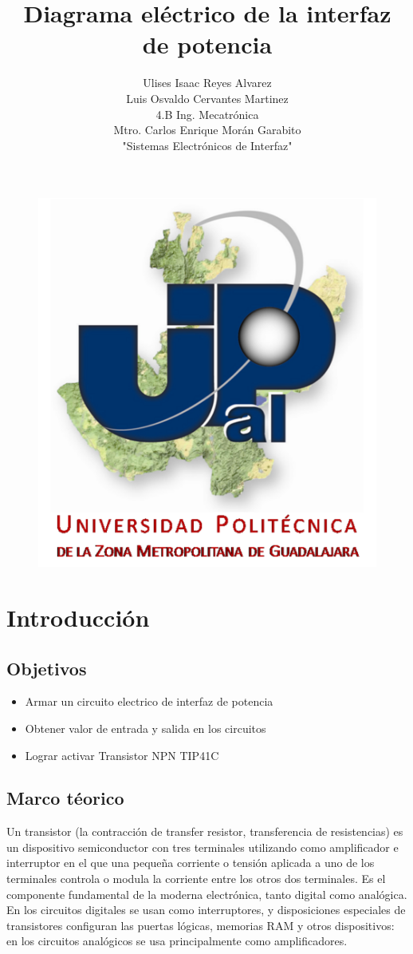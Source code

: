 \documentclass[10pt,a4paper]{article}
\author{Ulises Isaac Reyes Alvarez\\Luis Osvaldo Cervantes Martinez\\4.B Ing. Mecatrónica\\Mtro. Carlos Enrique Morán Garabito\\"Sistemas Electrónicos de Interfaz"}
\title{Diagrama eléctrico de la interfaz de potencia}
\begin{document}
\maketitle
\begin{figure}[hbtp]
\centering
\includegraphics[scale=2]{Pictures/UPZMG.png}
\end{figure}

\newpage
\section{Introducción}
\subsection*{Objetivos}
\begin{itemize}
\item Armar un circuito electrico de interfaz de potencia
\item Obtener valor de entrada y salida en los circuitos
\item Lograr activar Transistor NPN TIP41C 
\end{itemize}

\subsection*{Marco téorico}
Un transistor (la contracción de transfer resistor, transferencia de resistencias) es un dispositivo semiconductor con tres terminales utilizando como amplificador e interruptor en el que una pequeña corriente o tensión aplicada a uno de los terminales controla o modula la corriente entre los otros dos terminales. Es el componente fundamental de la moderna electrónica, tanto digital como analógica.\\
En los circuitos digitales se usan como interruptores, y disposiciones especiales de transistores configuran las puertas lógicas, memorias RAM y otros dispositivos: en los circuitos analógicos se usa principalmente como amplificadores. 
\end{document}
